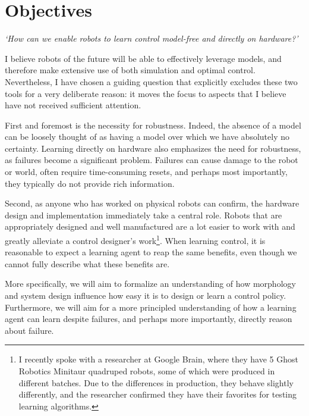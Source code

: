 \section{Objectives}
\emph{`How can we enable robots to learn control model-free and directly on hardware?'} \par
I believe robots of the future will be able to effectively leverage models, and therefore make extensive use of both simulation and optimal control.
Nevertheless, I have chosen a guiding question that explicitly excludes these two tools for a very deliberate reason: it moves the focus to aspects that I believe have not received sufficient attention. \par
First and foremost is the necessity for robustness. Indeed, the absence of a model can be loosely thought of as having a model over which we have absolutely no certainty.
Learning directly on hardware also emphasizes the need for robustness, as failures become a significant problem. Failures can cause damage to the robot or world, often require time-consuming resets, and perhaps most importantly, they typically do not provide rich information. \par
Second, as anyone who has worked on physical robots can confirm, the hardware design and implementation immediately take a central role. Robots that are appropriately designed and well manufactured are a lot easier to work with and greatly alleviate a control designer's work\footnote{I recently spoke with a researcher at Google Brain, where they have 5 Ghost Robotics Minitaur quadruped robots, some of which were produced in different batches. Due to the differences in production, they behave slightly differently, and the researcher confirmed they have their favorites for testing learning algorithms.}. When learning control, it is reasonable to expect a learning agent to reap the same benefits, even though we cannot fully describe what these benefits are. \par

More specifically, we will aim to formalize an understanding of how morphology and system design influence how easy it is to design or learn a control policy. Furthermore, we will aim for a more principled understanding of how a learning agent can learn despite failures, and perhaps more importantly, directly reason about failure.